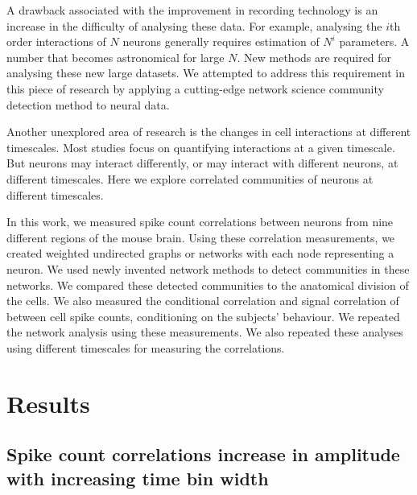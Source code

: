 \documentclass[a4paper,12pt]{article}
\theoremstyle{definition}
\begin{document}
A drawback associated with the improvement in recording technology is an increase in the difficulty of analysing these data. For example, analysing the $i$th order interactions of $N$ neurons generally requires estimation of $N^i$ parameters. A number that becomes astronomical for large $N$. New methods are required for analysing these new large datasets. We attempted to address this requirement in this piece of research by applying a cutting-edge network science community detection method to neural data.

Another unexplored area of research is the changes in cell interactions at different timescales. Most studies focus on quantifying interactions at a given timescale. But neurons may interact differently, or may interact with different neurons, at different timescales. Here we explore correlated communities of neurons at different timescales.

In this work, we measured spike count correlations between neurons from nine different regions of the mouse brain. Using these correlation measurements, we created weighted undirected graphs or networks with each node representing a neuron. We used newly invented network methods to detect communities in these networks. We compared these detected communities to the anatomical division of the cells. We also measured the conditional correlation and signal correlation of between cell spike counts, conditioning on the subjects' behaviour. We repeated the network analysis using these measurements. We also repeated these analyses using different timescales for measuring the correlations.

\section{Results}

    \subsection{Spike count correlations increase in amplitude with increasing time bin width}

    \newpage
\end{document}
